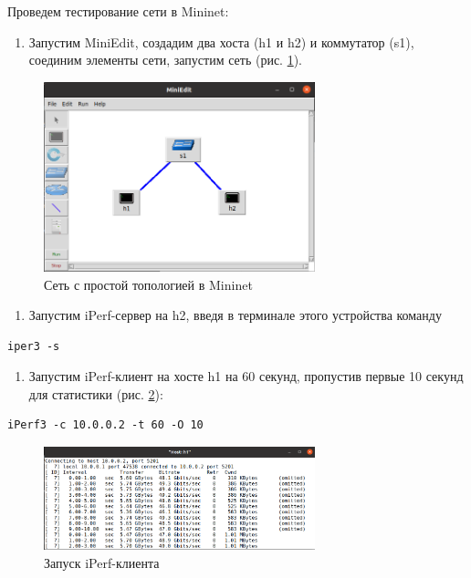 \documentclass[
  13pt,
  fontsize=13pt,
  russian,
  a4paper,
,captions=tableheading
]{scrreprt}
\providecommand{\tightlist}{%
  \setlength{\itemsep}{0pt}\setlength{\parskip}{0pt}}
\begin{document}
Проведем тестирование сети в Mininet:

\begin{enumerate}
\def\labelenumi{\arabic{enumi}.}
\tightlist
\item
  Запустим MiniEdit, создадим два хоста (h1 и h2) и коммутатор (s1),
  соединим элементы сети, запустим сеть (рис. \ref{fig:0011}).
\end{enumerate}

\begin{figure}
\hypertarget{fig:0011}{%
\centering
\includegraphics[width=0.7\textwidth,height=\textheight]{iperf_1.png}
\caption{Сеть с простой топологией в Mininet}\label{fig:0011}
}
\end{figure}

\begin{enumerate}
\def\labelenumi{\arabic{enumi}.}
\setcounter{enumi}{1}
\tightlist
\item
  Запустим iPerf-сервер на h2, введя в терминале этого устройства
  команду
\end{enumerate}

\begin{verbatim}
iper3 -s
\end{verbatim}

\begin{enumerate}
\def\labelenumi{\arabic{enumi}.}
\setcounter{enumi}{2}
\tightlist
\item
  Запустим iPerf-клиент на хосте h1 на 60 секунд, пропустив первые 10
  секунд для статистики (рис. \ref{fig:0012}):
\end{enumerate}

\begin{verbatim}
iPerf3 -c 10.0.0.2 -t 60 -O 10
\end{verbatim}

\begin{figure}
\hypertarget{fig:0012}{%
\centering
\includegraphics[width=0.7\textwidth,height=\textheight]{iperf_3.png}
\caption{Запуск iPerf-клиента}\label{fig:0012}
}
\end{figure}
\end{document}

